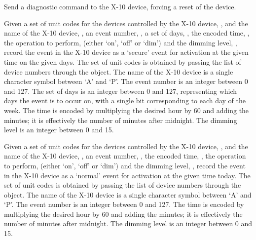   Send a diagnostic command to the X-10 device, forcing a reset of the device.

  Given a set of unit codes for the devices controlled by the X-10 device, , and the
  name of the X-10 device, , an event number, ,
  a set of days, , the encoded time, , the operation to
  perform,  (either `on', `off' or `dim') and the dimming level,
  , record the event in the X-10 device as a `secure' event for activation at the
  given time on the given days.
  The set of unit codes is obtained by passing the list of device numbers through the
   object.
  The name of the X-10 device is a single character symbol between `A' and `P'.
  The event number is an integer between 0 and 127.
  The set of days is an integer between 0 and 127, representing which days the event is to occur on,
  with a single bit corresponding to each day of the week.
  The time is encoded by multiplying the desired hour by 60 and adding the minutes; it is
  effectively the number of minutes after midnight.
  The dimming level is an integer between 0 and 15.

  Given a set of unit codes for the devices controlled by the X-10 device, , and
  the name of the X-10 device, , an event number, ,
  the encoded time, , the operation to perform, 
  (either `on', `off' or `dim') and the dimming level, , record the event in the
  X-10 device as a `normal' event for activation at the given time today.
  The set of unit codes is obtained by passing the list of device numbers through the
   object.
  The name of the X-10 device is a single character symbol between `A' and `P'.
  The event number is an integer between 0 and 127.
  The time is encoded by multiplying the desired hour by 60 and adding the minutes; it is
  effectively the number of minutes after midnight.
  The dimming level is an integer between 0 and 15.

